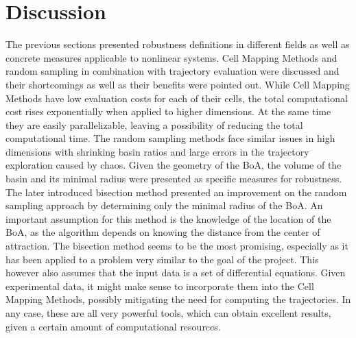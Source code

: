 \newpage
\section{Discussion} \label{Discussion}
The previous sections presented robustness definitions in different fields as well as concrete measures applicable to nonlinear systems. Cell Mapping Methods and random sampling in combination with trajectory evaluation were discussed and their shortcomings as well as their benefits were pointed out. While Cell Mapping Methods have low evaluation costs for each of their cells, the total computational cost rises exponentially when applied to higher dimensions. At the same time they are easily parallelizable, leaving a possibility of reducing the total computational time. The random sampling methods face similar issues in high dimensions with shrinking basin ratios and large errors in the trajectory exploration caused by chaos. Given the geometry of the BoA, the volume of the basin and its minimal radius were presented as specific measures for robustness. The later introduced bisection method presented an improvement on the random sampling approach by determining only the minimal radius of the BoA. An important assumption for this method is the knowledge of the location of the BoA, as the algorithm depends on knowing the distance from the center of attraction. 
The bisection method seems to be the most promising, especially as it has been applied to a problem very similar to the goal of the project. This however also assumes that the input data is a set of differential equations. Given experimental data, it might make sense to incorporate them into the Cell Mapping Methods, possibly mitigating the need for computing the trajectories. In any case, these are all very powerful tools, which can obtain excellent results, given a certain amount of computational resources.